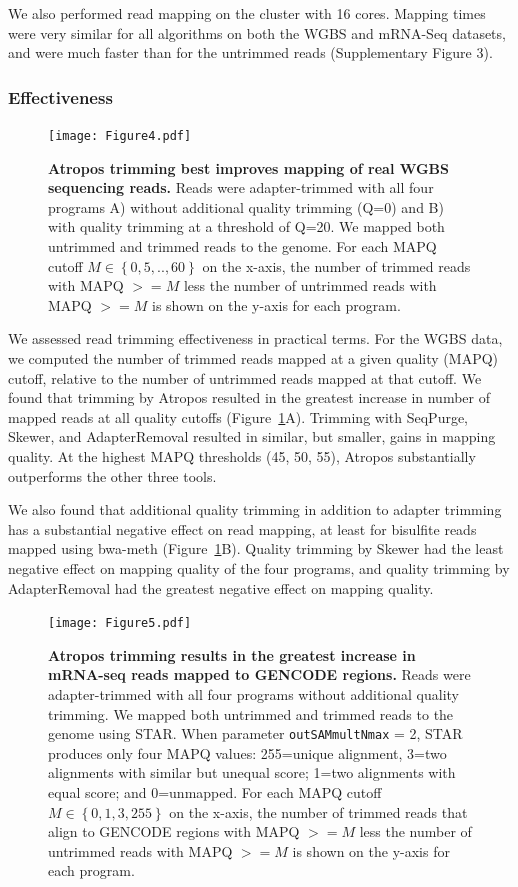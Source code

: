 \documentclass[fleqn,10pt,lineno]{wlpeerj} %
\begin{document}
We also performed read mapping on the cluster with 16 cores. Mapping times were very similar for all algorithms on both the WGBS and mRNA-Seq datasets, and were much faster than for the untrimmed reads (Supplementary Figure 3).

\subsubsection{Effectiveness}

\begin{figure}[!ht]
\centering
\texttt{[image: Figure4.pdf]}
\caption{\textbf{Atropos trimming best improves mapping of real WGBS sequencing reads.} Reads were adapter-trimmed with all four programs A) without additional quality trimming (Q=0) and B) with quality trimming at a threshold of Q=20. We mapped both untrimmed and trimmed reads to the genome. For each MAPQ cutoff $M \in \left\{{0, 5, .., 60}\right\}$ on the x-axis, the number of trimmed reads with MAPQ $>= M$ less the number of untrimmed reads with MAPQ $>= M$ is shown on the y-axis for each program.}
\label{fig:wgbs-effectiveness}
\end{figure}

We assessed read trimming effectiveness in practical terms. For the WGBS data, we computed the number of trimmed reads mapped at a given quality (MAPQ) cutoff, relative to the number of untrimmed reads mapped at that cutoff. We found that trimming by Atropos resulted in the greatest increase in number of mapped reads at all quality cutoffs (Figure~\ref{fig:wgbs-effectiveness}A). Trimming with SeqPurge, Skewer, and AdapterRemoval resulted in similar, but smaller, gains in mapping quality. At the highest MAPQ thresholds (45, 50, 55), Atropos substantially outperforms the other three tools.

We also found that additional quality trimming in addition to adapter trimming has a substantial negative effect on read mapping, at least for bisulfite reads mapped using bwa-meth (Figure~\ref{fig:wgbs-effectiveness}B). Quality trimming by Skewer had the least negative effect on mapping quality of the four programs, and quality trimming by AdapterRemoval had the greatest negative effect on mapping quality.

\begin{figure}[!ht]
\centering
\texttt{[image: Figure5.pdf]}
\caption{\textbf{Atropos trimming results in the greatest increase in mRNA-seq reads mapped to GENCODE regions.} Reads were adapter-trimmed with all four programs without additional quality trimming. We mapped both untrimmed and trimmed reads to the genome using STAR. When parameter \texttt{outSAMmultNmax} = 2, STAR produces only four MAPQ values: 255=unique alignment, 3=two alignments with similar but unequal score; 1=two alignments with equal score; and 0=unmapped. For each MAPQ cutoff $M \in \left\{{0, 1, 3, 255}\right\}$ on the x-axis, the number of trimmed reads that align to GENCODE regions with MAPQ $>= M$ less the number of untrimmed reads with MAPQ $>= M$ is shown on the y-axis for each program.}
\label{fig:rnaseq-effectiveness}
\end{figure}
\end{document}
